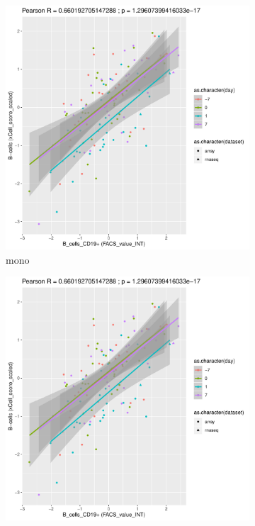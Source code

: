 \begin{figure}
    \centering
    \begin{subfigure}[b]{0.43\textwidth}
        \centering
        \includegraphics[width=1.0\textwidth,page=6]{mainmatter/figures/chapter_03/validate_xCell_estimates.cell_type_pairs.pdf}
        \caption{mono}
    \end{subfigure}%
    \vspace{1em}\vfill%
    \begin{subfigure}[b]{0.43\textwidth}
        \centering
        \includegraphics[width=1.0\textwidth,page=3]{mainmatter/figures/chapter_03/validate_xCell_estimates.cell_type_pairs.pdf}

\end{subfigure}
\end{figure}
